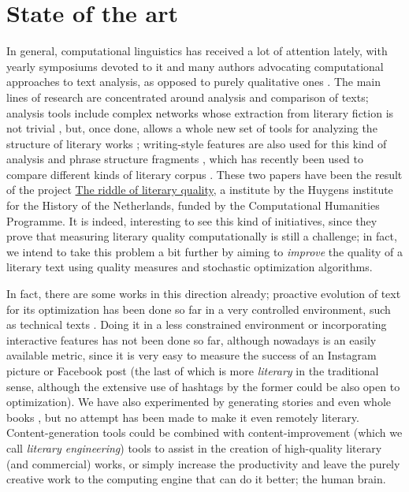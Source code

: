 \documentclass[a4paper,12pt,twocolumn]{article}
\begin{document}
\section{State of the art}

In general, computational linguistics  has received a lot of
attention lately, with yearly symposiums devoted to it and many
authors advocating computational approaches to text analysis, as
opposed to purely qualitative ones \cite{roque2012towards}. The main lines
of research are concentrated around analysis and comparison of texts;
analysis tools include complex networks
\cite{1367-2630-14-4-043029,0295-5075-100-5-58002} whose extraction
from literary fiction is not trivial \cite{elson2010extracting}, but,
once done, allows a whole new set of tools for analyzing the structure
of literary works \cite{seo14:snf};  writing-style
features \cite{ASI:ASI20316} are also used for this kind of analysis
and phrase structure fragments \cite{van2012literary}, which has
recently been used to compare different kinds of literary corpus
\cite{jautze2013high}. These two papers have been the result of the
project \href{http://literaryquality.huygens.knaw.nl/}{The riddle of
  literary quality}, a institute by the Huygens institute for the
History of the Netherlands, funded by the Computational Humanities
Programme. It is indeed, interesting to see this kind of initiatives,
since they prove that measuring literary quality computationally is
still a challenge; in fact, we intend to take this problem a bit
further by aiming to {\em improve} the quality of a literary text
using quality measures and stochastic optimization algorithms. 

In fact, there are some works in this direction already; proactive evolution of text for its optimization has been done so far
in a very controlled environment, such as technical texts
\cite{Rascu06acontrolled,hernandez2004checking}. Doing it in a less
constrained environment or incorporating interactive features
has not been done so far, although nowadays is an easily available
metric, since it is very easy to measure the success of an Instagram
picture or Facebook post (the last of which is more {\em literary} in
the traditional sense, although the extensive use of hashtags by the
former could be also open to optimization). We have also experimented
by generating stories \cite{2014arXiv1403.3084G} and even whole books
\cite{Merelo201401}, but no attempt has been made to make it even
remotely literary. Content-generation tools could be combined with
content-improvement (which we call {\em literary engineering}) tools
to assist in the creation of high-quality literary (and commercial)
works, or simply increase the productivity and leave the purely
creative work to the computing engine that can do it better; the human
brain. 
\end{document}
